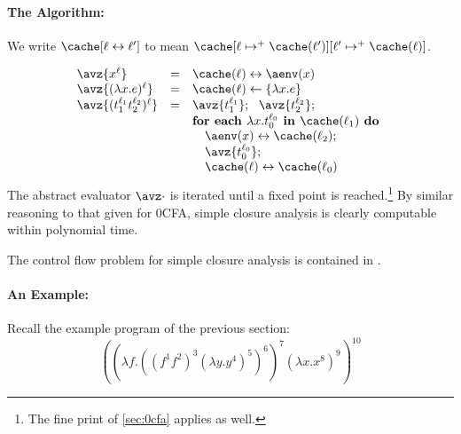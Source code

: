 \paragraph{The Algorithm:} 

We write $\cache[\ell \leftrightarrow \ell']$ to mean
$\cache[\ell\mapsto^+ \cache(\ell')][\ell'\mapsto^+ \cache(\ell)]$.

\begin{displaymath}
\begin{array}{lcl}
\avz{x^\ell}               & = & \cache(\ell) \leftrightarrow \aenv(x) \\
\avz{(\lambda x.e)^\ell} & = & \cache(\ell) \leftarrow \{ \lambda x.e \}\\
\avz{(t^{\ell_1}_1 t^{\ell_2}_2)^\ell} & = & \avz{t^{\ell_1}_1};\ \ \avz{t^{\ell_2}_2};\\
\ &\ & \mbox{\bf for each }\lambda x.t^{\ell_0}_0 \mbox{\bf\ in\ } \cache(\ell_1)\mbox{\bf\ do }\\
\ &\ & \quad \aenv(x)\leftrightarrow\cache(\ell_2);\\
\ &\ & \quad \avz{t^{\ell_0}_0};\\
\ &\ & \quad \cache(\ell)\leftrightarrow\cache(\ell_0)
\end{array}
\end{displaymath}
The abstract evaluator $\avz\cdot$ is iterated until a fixed point
is reached.\footnote{The fine print of \autoref{sec:0cfa} applies as
well.}  By similar reasoning to that given for 0CFA, simple closure
analysis is clearly computable within polynomial time.

\begin{lemma}
The control flow problem for simple closure analysis is contained in \ptime.
\end{lemma}

\paragraph{An Example:}

Recall the example program of the previous section:
\begin{displaymath}
((\lambda f.((f^1 f^2)^3(\lambda y.y^4)^5)^6)^7 (\lambda
x.x^8)^9)^{10}
\end{displaymath}

